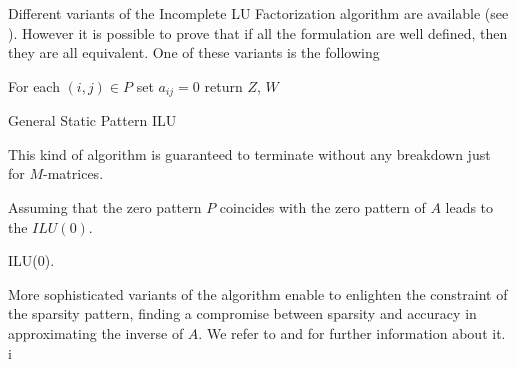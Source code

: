 Different variants of the
Incomplete LU Factorization algorithm are available (see \cite{Saad}).
However it is
possible to prove that if all the formulation are well defined, then they are
all equivalent.
One of these variants is the following

\begin{algorithm}[H]
 For each $(i,j)\in P$ set $a_{ij}=0$\;
 return $Z$, $W$\;
 \caption{General Static Pattern ILU}
\end{algorithm}

This kind of algorithm is guaranteed to terminate without any breakdown just
for $M$-matrices.

Assuming that the zero pattern $P$ coincides with the zero pattern of $A$ leads
to the $ILU(0)$. \newline

\begin{algorithm}[H]
 \caption{ILU(0).}
\end{algorithm}

More sophisticated variants of the algorithm enable to enlighten the constraint
of the sparsity pattern, finding a compromise between sparsity and accuracy in
approximating the inverse of $A$. We refer to \cite{Saad} and
\cite{Benzi2002} for further information about it.
i
